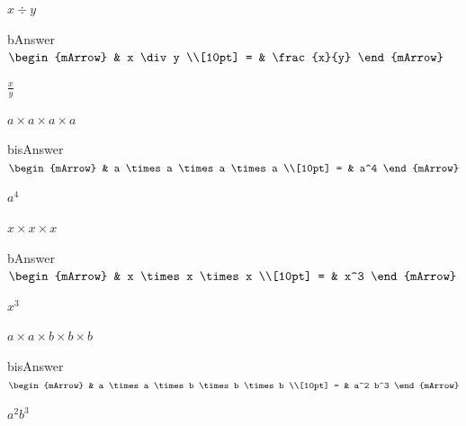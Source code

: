 \begin{enumerate}[resume]
\begin{subtask}
    \task[]  $ x \div y $
              \begin{envOut}[height=3cm]{bAnswer}
			       $\begin{mArrow}
			                & x \div y      \\[10pt]
                          = & \frac{x}{y}	   
	                \end{mArrow}$
              \end{envOut}			  
			  \begin{exercise}\begin{shortsolution}  
				       $\frac{x}{y}$
			  \end{shortsolution}\end{exercise}

    \task[]  $ a \times a \times a \times a$
              \begin{envOut}[height=3cm]{bisAnswer}
			       $\begin{mArrow}
			                & a \times a \times a \times a      \\[10pt]
                          = & a^4	   
	                \end{mArrow}$
              \end{envOut}			  
			  \begin{exercise}\begin{shortsolution}  
				       $a^4$
			  \end{shortsolution}\end{exercise}

    \task[]  $ x \times x \times x $
              \begin{envOut}[height=3cm]{bAnswer}
			       $\begin{mArrow}
			                & x \times x \times x      \\[10pt]
                          = & x^3	   
	                \end{mArrow}$
              \end{envOut}			  
			  \begin{exercise}\begin{shortsolution}  
				       $x^3$
			  \end{shortsolution}\end{exercise}

    \task[]  $ a \times a \times b \times b \times b $
              \begin{envOut}[height=3cm]{bisAnswer}
			       $\begin{mArrow}
			                & a \times a \times b \times b \times b       \\[10pt]
                          = & a^2 b^3	   
	                \end{mArrow}$
              \end{envOut}			  
			  \begin{exercise}\begin{shortsolution}  
				       $a^2 b^3$
			  \end{shortsolution}\end{exercise}


\end{subtask}
\end{enumerate}
